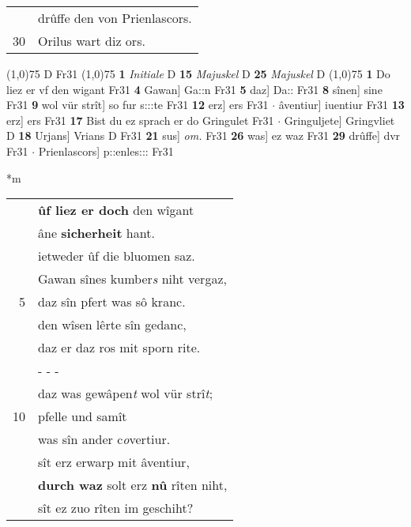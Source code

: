 \documentclass[8pt,a4paper,notitlepage]{article}
\begin{document}
\begin{table}[ht]
\begin{minipage}[t]{0.5\linewidth}
\begin{tabular}{rl}
 & drûffe den von Prienlascors.\\ 
30 & Orilus wart diz ors.\\ 
\end{tabular}
\scriptsize
\line(1,0){75} \newline
D Fr31 \newline
\line(1,0){75} \newline
\textbf{1} \textit{Initiale} D  \textbf{15} \textit{Majuskel} D  \textbf{25} \textit{Majuskel} D  \newline
\line(1,0){75} \newline
\textbf{1} Do liez er vf den wigant Fr31 \textbf{4} Gawan] Ga::n Fr31 \textbf{5} daz] Da:: Fr31 \textbf{8} sînen] sine Fr31 \textbf{9} wol vür strît] so fur s:::te Fr31 \textbf{12} erz] ers Fr31  $\cdot$ âventiur] iuentiur Fr31 \textbf{13} erz] ers Fr31 \textbf{17} Bist du ez sprach er do Gringulet Fr31  $\cdot$ Gringuljete] Gringvliet D \textbf{18} Urjans] Vrians D Fr31 \textbf{21} sus] \textit{om.} Fr31 \textbf{26} was] ez waz Fr31 \textbf{29} drûffe] dvr Fr31  $\cdot$ Prienlascors] p::enles::: Fr31 \newline
\end{minipage}
\hspace{0.5cm}
\begin{minipage}[t]{0.5\linewidth}
\small
\begin{center}*m
\end{center}
\begin{tabular}{rl}
 & \textbf{ûf liez er doch} den wîgant\\ 
 & âne \textbf{sicherheit} hant.\\ 
 & ietweder ûf die bluomen saz.\\ 
 & Gawan sînes kumber\textit{s} niht vergaz,\\ 
5 & daz sîn pfert was sô kranc.\\ 
 & den wîsen lêrte sîn gedanc,\\ 
 & daz er daz ros mit sporn rite.\\ 
 & \multicolumn{1}{l}{ - - - }\\ 
 & daz was gewâpen\textit{t} wol vür strî\textit{t};\\ 
10 & pfelle und samît\\ 
 & was sîn ander c\textit{o}vertiur.\\ 
 & sît erz erwarp mit âventiur,\\ 
 & \textbf{durch waz} solt erz \textbf{nû} rîten niht,\\ 
 & sît ez zuo rîten im geschiht?\\ 

\end{tabular}
\end{minipage}
\end{table}
\end{document}
